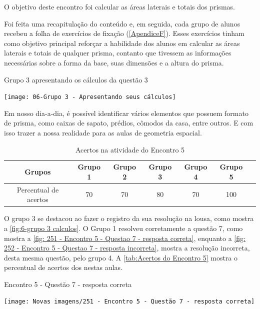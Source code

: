 O objetivo deste encontro foi calcular as áreas laterais e totais dos prismas.

Foi feita uma recapitulação do conteúdo e, em seguida, cada grupo de alunos recebeu a folha de exercícios de fixação (\autoref{ApendiceF}). Esses exercícios tinham como objetivo principal reforçar a habilidade dos alunos em calcular as áreas laterais e totais de qualquer prisma, contanto que tivessem as informações necessárias sobre a forma da base, suas dimensões e a altura do prisma.

\begin{CenteredFigure}
    \caption{Grupo 3 apresentando os cálculos da questão 3} \label{fig:6-grupo 3 calculos}
    \texttt{[image: 06-Grupo 3 - Apresentando seus cálculos]}
    \legend{\autoria}
\end{CenteredFigure}

Em nosso dia-a-dia, é possível identificar vários elementos que possuem formato de prisma, como caixas de sapato, prédios, cômodos da casa, entre outros. E com isso trazer a nossa realidade para as aulas de geometria espacial.

\begin{table}[htbp] \centering
    \caption{Acertos na atividade do Encontro 5} \label{tab:Acertos do Encontro 5}
    \begin{tabular}{|c|c|c|c|c|c|c|}
        \hline
        \textbf{Grupos}       & \textbf{Grupo 1} & \textbf{Grupo 2} & \textbf{Grupo 3} & \textbf{Grupo 4} & \textbf{Grupo 5} \\
        \hline
        Percentual de acertos & 70               & 70               & 80               & 70               & 100              \\
        \hline
    \end{tabular}
    \legend{\legendaTabela}
\end{table}

O grupo 3 se destacou ao fazer o registro da sua resolução na lousa, como mostra a \autoref{fig:6-grupo 3 calculos}. O Grupo 1 resolveu corretamente a questão 7, como mostra a \autoref{fig: 251 - Encontro 5 - Questao 7 - resposta correta}, enquanto a \autoref{fig: 252 - Encontro 5 - Questao 7 - resposta incorreta}, mostra a resolução incorreta, desta mesma questão, pelo grupo 4. A \autoref{tab:Acertos do Encontro 5} mostra o percentual de acertos dos nestas aulas.

\begin{CenteredFigure}
    \caption{Encontro 5 - Questão 7 - resposta correta} \label{fig: 251 - Encontro 5 - Questao 7 - resposta correta}
    \texttt{[image: Novas imagens/251 - Encontro 5 - Questão 7 - resposta correta]}
    \legend{\autoria}
\end{CenteredFigure}


